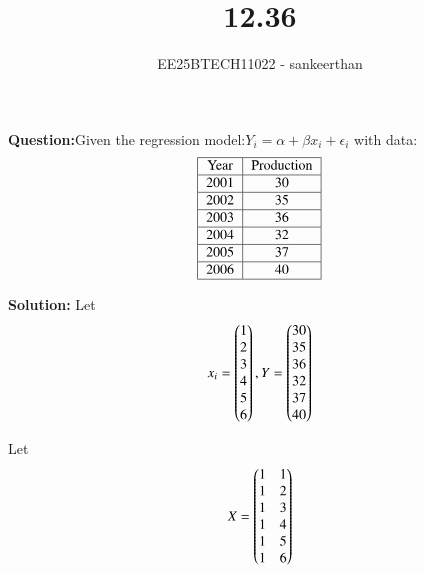 \documentclass[journal]{IEEEtran}
\begin{document}


\title{12.36}
\author{EE25BTECH11022 - sankeerthan}
{\let\newpage\relax\maketitle}

\renewcommand{\thefigure}{\theenumi}
\renewcommand{\thetable}{\theenumi}
\setlength{\intextsep}{10pt} %


\renewcommand{\thetable}{\theenumi}

\textbf{Question:}Given the regression model:$Y_i = \alpha + \beta x_i + \epsilon_i$ with data:  \\ \begin{align}
\begin{tabular}{|c|c|}\hline
\text{Year} & \text{Production} \\ \hline
2001 & 30 \\ \hline
2002 & 35 \\ \hline
2003 & 36 \\ \hline
2004 & 32 \\ \hline
2005 & 37 \\ \hline
2006 & 40 \\ \hline
\end{tabular}
\end{align}

\textbf{Solution:}
Let
\begin{align}
x_i = \begin{pmatrix}1 \\ 2 \\ 3 \\ 4 \\ 5 \\ 6\end{pmatrix}, Y = \begin{pmatrix}30 \\ 35 \\ 36 \\ 32 \\ 37 \\ 40\end{pmatrix}
\end{align}

Let
\begin{align}
X = \begin{pmatrix}1 & 1 \\1 & 2 \\1 & 3 \\1 & 4 \\1 & 5 \\1 & 6\end{pmatrix}
\end{align}
\end{document}

